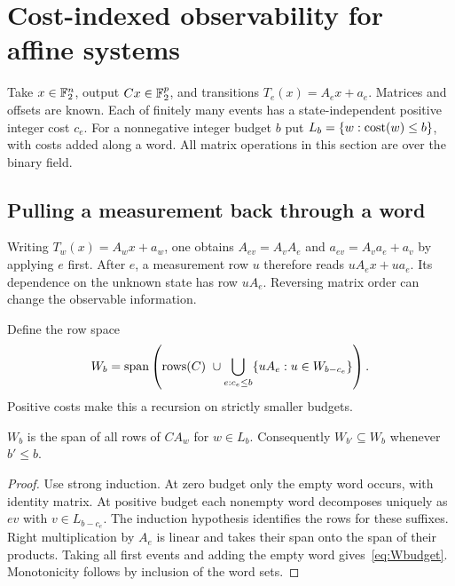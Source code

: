 \section{Cost-indexed observability for affine systems}\label{sec:linear}
Take $x\in\mathbb F_2^n$, output $Cx\in\mathbb F_2^p$, and transitions $T_e(x)=A_ex+a_e$. Matrices and offsets are known. Each of finitely many events has a state-independent positive integer cost $c_e$. For a nonnegative integer budget $b$ put $L_b=\{w:\operatorname{cost}(w)\le b\}$, with costs added along a word. All matrix operations in this section are over the binary field.

\subsection{Pulling a measurement back through a word}
Writing $T_w(x)=A_wx+a_w$, one obtains $A_{ev}=A_vA_e$ and $a_{ev}=A_va_e+a_v$ by applying $e$ first. After $e$, a measurement row $u$ therefore reads $uA_ex+ua_e$. Its dependence on the unknown state has row $uA_e$. Reversing matrix order can change the observable information.

Define the row space
\begin{equation}\label{eq:Wbudget}
W_b=\operatorname{span}\left(\operatorname{rows}(C)\ \cup
\bigcup_{e:c_e\le b}\{uA_e:u\in W_{b-c_e}\}\right).
\end{equation}
Positive costs make this a recursion on strictly smaller budgets.
\begin{lemma}\label{lem:wordspace}
$W_b$ is the span of all rows of $CA_w$ for $w\in L_b$. Consequently $W_{b'}\subseteq W_b$ whenever $b'\le b$.
\end{lemma}
\begin{proof}
Use strong induction. At zero budget only the empty word occurs, with identity matrix. At positive budget each nonempty word decomposes uniquely as $ev$ with $v\in L_{b-c_e}$. The induction hypothesis identifies the rows for these suffixes. Right multiplication by $A_e$ is linear and takes their span onto the span of their products. Taking all first events and adding the empty word gives~\eqref{eq:Wbudget}. Monotonicity follows by inclusion of the word sets.
\end{proof}

